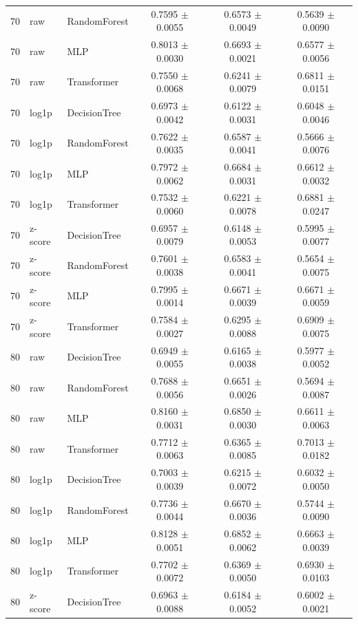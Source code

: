 \begin{longtable}{rllccc}
70 & raw & RandomForest & 0.7595 $\pm$ 0.0055 & 0.6573 $\pm$ 0.0049 & 0.5639 $\pm$ 0.0090 \\
70 & raw & MLP & 0.8013 $\pm$ 0.0030 & 0.6693 $\pm$ 0.0021 & 0.6577 $\pm$ 0.0056 \\
70 & raw & Transformer & 0.7550 $\pm$ 0.0068 & 0.6241 $\pm$ 0.0079 & 0.6811 $\pm$ 0.0151 \\
70 & log1p & DecisionTree & 0.6973 $\pm$ 0.0042 & 0.6122 $\pm$ 0.0031 & 0.6048 $\pm$ 0.0046 \\
70 & log1p & RandomForest & 0.7622 $\pm$ 0.0035 & 0.6587 $\pm$ 0.0041 & 0.5666 $\pm$ 0.0076 \\
70 & log1p & MLP & 0.7972 $\pm$ 0.0062 & 0.6684 $\pm$ 0.0031 & 0.6612 $\pm$ 0.0032 \\
70 & log1p & Transformer & 0.7532 $\pm$ 0.0060 & 0.6221 $\pm$ 0.0078 & 0.6881 $\pm$ 0.0247 \\
70 & z-score & DecisionTree & 0.6957 $\pm$ 0.0079 & 0.6148 $\pm$ 0.0053 & 0.5995 $\pm$ 0.0077 \\
70 & z-score & RandomForest & 0.7601 $\pm$ 0.0038 & 0.6583 $\pm$ 0.0041 & 0.5654 $\pm$ 0.0075 \\
70 & z-score & MLP & 0.7995 $\pm$ 0.0014 & 0.6671 $\pm$ 0.0039 & 0.6671 $\pm$ 0.0059 \\
70 & z-score & Transformer & 0.7584 $\pm$ 0.0027 & 0.6295 $\pm$ 0.0088 & 0.6909 $\pm$ 0.0075 \\
80 & raw & DecisionTree & 0.6949 $\pm$ 0.0055 & 0.6165 $\pm$ 0.0038 & 0.5977 $\pm$ 0.0052 \\
80 & raw & RandomForest & 0.7688 $\pm$ 0.0056 & 0.6651 $\pm$ 0.0026 & 0.5694 $\pm$ 0.0087 \\
80 & raw & MLP & 0.8160 $\pm$ 0.0031 & 0.6850 $\pm$ 0.0030 & 0.6611 $\pm$ 0.0063 \\
80 & raw & Transformer & 0.7712 $\pm$ 0.0063 & 0.6365 $\pm$ 0.0085 & 0.7013 $\pm$ 0.0182 \\
80 & log1p & DecisionTree & 0.7003 $\pm$ 0.0039 & 0.6215 $\pm$ 0.0072 & 0.6032 $\pm$ 0.0050 \\
80 & log1p & RandomForest & 0.7736 $\pm$ 0.0044 & 0.6670 $\pm$ 0.0036 & 0.5744 $\pm$ 0.0090 \\
80 & log1p & MLP & 0.8128 $\pm$ 0.0051 & 0.6852 $\pm$ 0.0062 & 0.6663 $\pm$ 0.0039 \\
80 & log1p & Transformer & 0.7702 $\pm$ 0.0072 & 0.6369 $\pm$ 0.0050 & 0.6930 $\pm$ 0.0103 \\
80 & z-score & DecisionTree & 0.6963 $\pm$ 0.0088 & 0.6184 $\pm$ 0.0052 & 0.6002 $\pm$ 0.0021 \\

\end{longtable}
